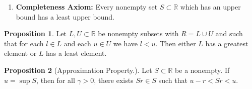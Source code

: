 \documentclass[12pt]{article}
\newcommand{\R}{\mathbb{R}}
\theoremstyle{definition}
\newtheorem{prop}{Proposition}
\begin{document}
\begin{enumerate}[label=\textbf{C}.]
    \item \textbf{Completeness Axiom:} Every nonempty set \( S \subset \R \) which has an upper bound has a least upper bound. 
\end{enumerate}


\begin{prop}

    Let \( L, U \subset \R \) be nonempty subsets with \( R = L \cup U \) and such that for each \( l \in L \) and each \( u \in U \) we have \( l  < u \). Then either \( L \) has a greatest element or \( L \) has a least element. 
    
\end{prop}

\begin{prop}[Approximation Property.]
    Let \( S \subset \R \) be a nonempty. If \( u = \sup S \), then for all \( \gamma >  0 \), there exists \( Sr \in S \) such that \( u - r < Sr < u \).
    
\end{prop}
\end{document}
